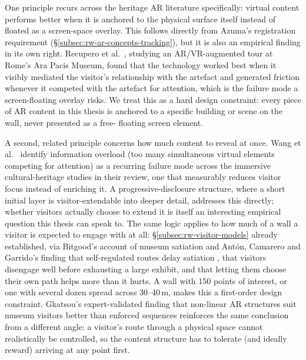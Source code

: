 One principle recurs across the heritage AR literature specifically: virtual content
performs better when it is anchored to the physical surface itself instead of
floated as a screen-space overlay. This follows directly from Azuma's registration
requirement (\S\ref{subsec:rw-ar-concepts-tracking}), but it is also an empirical
finding in its own right. Recupero et al.\ \cite{recupero2019}, studying an
AR/VR-augmented tour at Rome's Ara Pacis Museum, found that the technology worked
best when it visibly mediated the visitor's relationship with the artefact and
generated friction whenever it competed with the artefact for attention, which is
the failure mode a screen-floating overlay risks. We treat this as a hard design
constraint: every piece of AR content in this thesis is
anchored to a specific building or scene on the wall, never presented as a free-
floating screen element.

A second, related principle concerns how much content to reveal at once. Wang
et al.\ \cite{wang2025grand} identify information overload (too many simultaneous virtual elements competing for attention) as a recurring failure mode across the
immersive cultural-heritage studies in their review, one that measurably reduces
visitor focus instead of enriching it. A progressive-disclosure structure, where a
short initial layer is visitor-extendable into deeper detail, addresses this directly; whether visitors actually choose to extend
it is itself an interesting empirical question this thesis can speak to. The same
logic applies to how much of a wall a visitor is expected to engage with at all:
§\ref{subsec:rw-visitor-models} already established, via Bitgood's account of museum
satiation \cite{bitgood2009a,bitgood2009b} and Ant\'on, Camarero and Garrido's finding
that self-regulated routes delay satiation \cite{anton2018}, that visitors disengage
well before exhausting a large exhibit, and that letting them choose their own path
helps more than it hurts. A wall with 150 points of interest, or one with several
dozen spread across 30--40\,m, makes this a first-order design constraint. Gkatsou's expert-validated finding that non-linear AR
structures suit museum visitors better than enforced sequences
\cite{gkatsou2018} reinforces the same conclusion from a different angle: a visitor's
route through a physical space cannot realistically be controlled, so the content
structure has to tolerate (and ideally reward) arriving at any point first.


